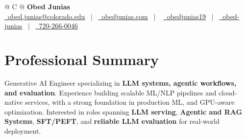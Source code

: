\documentclass[a4paper,11pt]{article}
\begin{document}
\pagestyle{empty}


\begin{tabularx}{\linewidth}{@{} C @{}}
  \Huge {\textbf{Obed Junias} }\\[1pt]
  \href{mailto:obed.junias@colorado.edu}{\raisebox{-0.05\height}\faEnvelope \ obed.junias@colorado.edu} \ $|$ \
  \href{https://obedjunias.github.io}{\raisebox{-0.05\height}\faGlobe\ obedjunias.com} \ $|$ \
  \href{https://github.com/obedjunias19}{\raisebox{-0.05\height}\faGithub \ obedjunias19} \ $|$ \
  \href{https://linkedin.com/in/obed-junias}{\raisebox{-0.05\height}\faLinkedin\ obed-junias} \ $|$ \
  \href{tel:+1720-266-0046}{\raisebox{-0.05\height}\faMobile \ 720-266-0046} \\
\end{tabularx}

\color{BlueViolet}
\section*{Professional Summary}
\color{black}
Generative AI Engineer specializing in \textbf{LLM systems, agentic workflows, and evaluation}. Experience building scalable ML/NLP pipelines and cloud-native services, with a strong foundation in production ML, and GPU-aware optimization. Interested in roles spanning \textbf{LLM serving}, \textbf{Agentic and RAG Systems}, \textbf{SFT/PEFT}, and \textbf{reliable LLM evaluation} for real-world deployment.

\color{BlueViolet}
\end{document}
